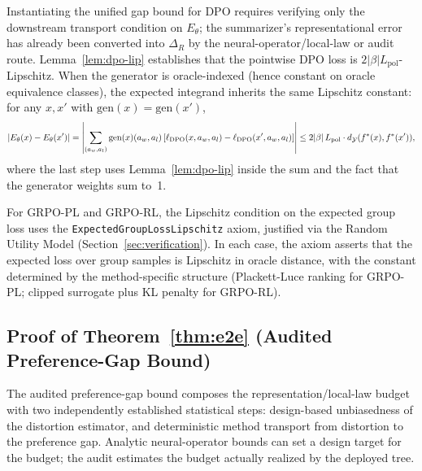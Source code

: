 Instantiating the unified gap bound for DPO requires verifying only the downstream transport condition on $E_\theta$; the summarizer's representational error has already been converted into $\Delta_R$ by the neural-operator/local-law or audit route. Lemma~\ref{lem:dpo-lip} establishes that the pointwise DPO loss is $2|\beta|L_{\mathrm{pol}}$-Lipschitz. When the generator is oracle-indexed (hence constant on oracle equivalence classes), the expected integrand inherits the same Lipschitz constant: for any $x, x'$ with $\mathrm{gen}(x) = \mathrm{gen}(x')$,
\[
|E_\theta(x) - E_\theta(x')| = \left|\sum_{(a_w, a_l)} \mathrm{gen}(x)(a_w, a_l)\, [\ell_{\mathrm{DPO}}(x, a_w, a_l) - \ell_{\mathrm{DPO}}(x', a_w, a_l)]\right| \le 2|\beta|\,L_{\mathrm{pol}} \cdot d_{\mathcal{Y}}(f^\ast(x), f^\ast(x')),
\]
where the last step uses Lemma~\ref{lem:dpo-lip} inside the sum and the fact that the generator weights sum to~1.

For GRPO-PL and GRPO-RL, the Lipschitz condition on the expected group loss uses the \texttt{ExpectedGroupLossLipschitz} axiom, justified via the Random Utility Model (Section~\ref{sec:verification}). In each case, the axiom asserts that the expected loss over group samples is Lipschitz in oracle distance, with the constant determined by the method-specific structure (Plackett-Luce ranking for GRPO-PL; clipped surrogate plus KL penalty for GRPO-RL).

\subsection{Proof of Theorem~\ref{thm:e2e} (Audited Preference-Gap Bound)}\label{app:proof-e2e}

The audited preference-gap bound composes the representation/local-law budget with two independently established statistical steps: design-based unbiasedness of the distortion estimator, and deterministic method transport from distortion to the preference gap. Analytic neural-operator bounds can set a design target for the budget; the audit estimates the budget actually realized by the deployed tree.

